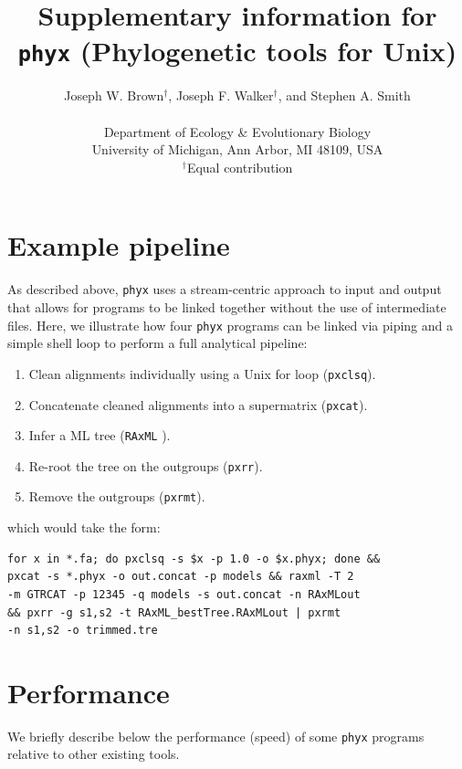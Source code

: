 \documentclass{article}
\begin{document}
\title{Supplementary information for \texttt{phyx} (Phylogenetic tools for Unix)}

\author{Joseph W. Brown$^{\dagger}$, Joseph F. Walker$^{\dagger}$, and Stephen A. Smith\\\\
\normalsize{Department of Ecology \& Evolutionary Biology}\\
\normalsize{University of Michigan, Ann Arbor, MI 48109, USA}\\
\normalsize{$^{\dagger}$Equal contribution}}
\date{} %
\maketitle

\section{Example pipeline}
As described above, \texttt{phyx} uses a stream-centric approach to input and output that allows for programs to be linked together without the use of intermediate files. Here, we illustrate how four \texttt{phyx} programs can be linked via piping
and a simple shell loop to perform a full analytical pipeline:
\begin{enumerate}
\item Clean alignments individually using a Unix for loop (\texttt{pxclsq}).
\item Concatenate cleaned alignments into a supermatrix (\texttt{pxcat}).
\item Infer a ML tree (\texttt{RAxML} \citep{Stamatakis2014}).
\item Re-root the tree on the outgroups (\texttt{pxrr}).
\item Remove the outgroups (\texttt{pxrmt}).
\end{enumerate}
which would take the form:

\begin{verbatim}
for x in *.fa; do pxclsq -s $x -p 1.0 -o $x.phyx; done &&
pxcat -s *.phyx -o out.concat -p models && raxml -T 2
-m GTRCAT -p 12345 -q models -s out.concat -n RAxMLout
&& pxrr -g s1,s2 -t RAxML_bestTree.RAxMLout | pxrmt
-n s1,s2 -o trimmed.tre
\end{verbatim}

\section{Performance}
We briefly describe below the performance (speed) of some \texttt{phyx} programs relative to other existing tools.
\end{document}
